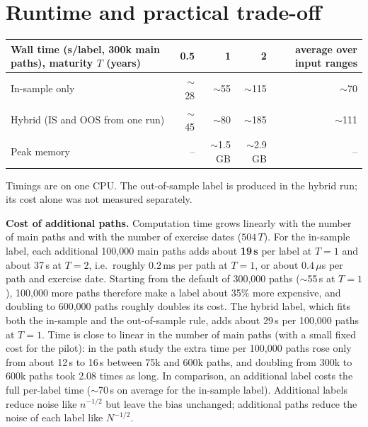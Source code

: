 \documentclass[10pt,letterpaper]{article}
\begin{document}
\section*{Runtime and practical trade-off}
\begin{center}
\fontsize{8.65}{10}\selectfont
\begin{tabular}{@{}lrrrr@{}}
\toprule
Wall time (s/label, 300k main paths), maturity $T$ (years) & 0.5 & 1 & 2 & average over input ranges\\
\midrule
In-sample only & $\sim$28 & $\sim$55 & $\sim$115 & $\sim$70\\
Hybrid (IS and OOS from one run) & $\sim$45 & $\sim$80 & $\sim$185 & $\sim$111\\
Peak memory & -- & $\sim$1.5 GB & $\sim$2.9 GB & --\\
\bottomrule
\end{tabular}
\end{center}
Timings are on one CPU. The out-of-sample label is produced in the hybrid run; its cost alone was not
measured separately.

\textbf{Cost of additional paths.} Computation time grows linearly with the number of main paths and
with the number of exercise dates ($504\,T$). For the in-sample label, each additional 100,000 main
paths adds about \textbf{19\,s} per label at $T=1$ and about 37\,s at $T=2$, i.e.\ roughly
$0.2$\,ms per path at $T=1$, or about $0.4\,\mu$s per path and exercise date. Starting from the
default of 300,000 paths ($\sim$55\,s at $T=1$), 100,000 more paths therefore make a label about
35\% more expensive, and doubling to 600,000 paths roughly doubles its cost. The hybrid label, which
fits both the in-sample and the out-of-sample rule, adds about 29\,s per 100,000 paths at $T=1$.
Time is close to linear in the number of main paths (with a small fixed cost for the pilot): in the
path study the extra time per 100,000 paths rose only from about 12\,s to 16\,s between 75k and
600k paths, and doubling from 300k to 600k paths took 2.08 times as long.
In comparison, an additional label costs the full per-label time ($\sim$70\,s on average for the
in-sample label). Additional labels reduce noise like $n^{-1/2}$ but leave the bias unchanged;
additional paths reduce the noise of each label like $N^{-1/2}$.
\end{document}
